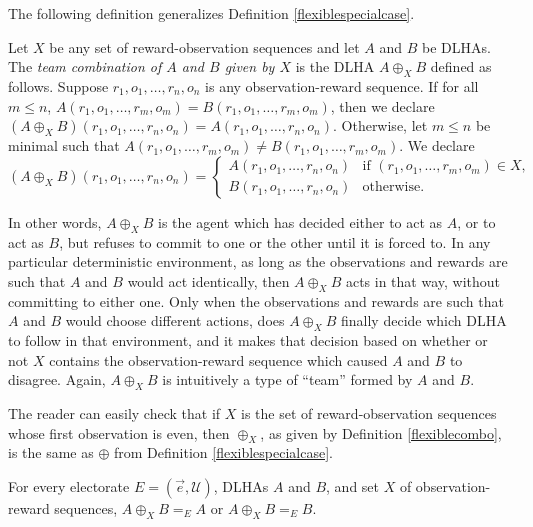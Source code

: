\documentclass[twoside,11pt]{article}
\begin{document}
The following definition generalizes Definition \ref{flexiblespecialcase}.

\begin{definition}
\label{flexiblecombo}
    Let $X$ be any set of reward-observation sequences and let $A$ and $B$ be DLHAs.
    The \emph{team combination of $A$ and $B$ given by $X$} is the DLHA
    $A\oplus_X B$ defined as follows.
    Suppose $r_1,o_1,\ldots,r_n,o_n$ is any observation-reward sequence.
    If for all $m\leq n$, $A(r_1,o_1,\ldots,r_m,o_m)=B(r_1,o_1,\ldots,r_m,o_m)$,
    then we declare $(A\oplus_X B)(r_1,o_1,\ldots,r_n,o_n)=A(r_1,o_1,\ldots,r_n,o_n)$.
    Otherwise, let $m\leq n$ be minimal such that
    $A(r_1,o_1,\ldots,r_m,o_m)\neq B(r_1,o_1,\ldots,r_m,o_m)$.
    We declare
    \[
        (A\oplus_X B)(r_1,o_1,\ldots,r_n,o_n) =
        \begin{cases}
            A(r_1,o_1,\ldots,r_n,o_n) & \mbox{if $(r_1,o_1,\ldots,r_m,o_m)\in X$},\\
            B(r_1,o_1,\ldots,r_n,o_n) & \mbox{otherwise}.
        \end{cases}
    \]
\end{definition}

In other words, $A\oplus_X B$ is the agent which has decided either to act as $A$,
or to act as $B$, but refuses to commit to one or the other until it is forced to.
In any particular deterministic environment, as long as the observations and
rewards are such that
$A$ and $B$ would act identically, then $A\oplus_X B$ acts in that way, without
committing to either one. Only when the observations and rewards are such that $A$
and $B$ would choose different actions, does $A\oplus_X B$ finally decide which DLHA
to follow in that environment, and it makes that decision based on whether or not
$X$ contains the observation-reward sequence which caused $A$ and $B$ to disagree.
Again, $A\oplus_X B$ is intuitively a type of ``team'' formed by $A$ and $B$.

The reader can easily check that if $X$ is the set of reward-observation sequences whose first
observation is even, then $\oplus_X$, as given by Definition \ref{flexiblecombo},
is the same as $\oplus$ from Definition \ref{flexiblespecialcase}.

\begin{proposition}
\label{splittingproposition}
    For every electorate $E=(\vec{e},\mathscr U)$, DLHAs $A$ and $B$, and set $X$ of
    observation-reward sequences,
    $A\oplus_X B =_{E} A$ or $A\oplus_X B =_{E}B$.
\end{proposition}
\end{document}
